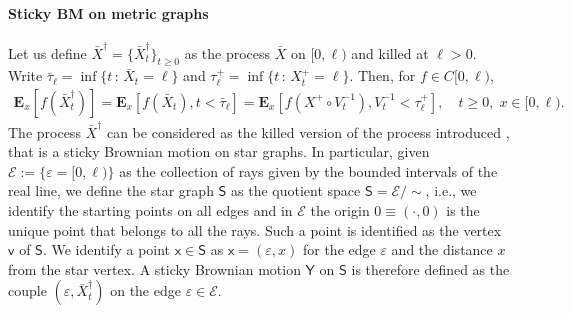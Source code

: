 \documentclass[[11pt,a4paper,reqno]{article}
\numberwithin{equation}{section}
\begin{document}
\paragraph{Sticky BM on metric graphs}
Let us define $\bar{X}^\dagger = \{\bar{X}^\dagger_t\}_{t\geq 0}$ as the process $\bar{X}$ on $[0, \ell)$ and killed at $\ell>0$. Write $\bar{\tau}_\ell = \inf\{t\,:\, \bar{X}_t=\ell\}$ and $\tau^+_\ell = \inf\{t\,:\, X^+_t=\ell\}$. Then, for $f \in C[0,\ell)$,
\begin{align*}
\mathbf{E}_x[f(\bar{X}^\dagger_t)] = \mathbf{E}_x[f(\bar{X}_t), t < \bar{\tau}_\ell] = \mathbf{E}_x[f(X^+ \circ V^{-1}_t), V^{-1}_t < \tau^+_\ell], \quad t\geq 0,\; x \in [0, \ell).
\end{align*}    
The process $\bar{X}^\dagger$ can be considered as the killed version of the process introduced \cite{BonDovStar}, that is a sticky Brownian motion on star graphs. In particular, given $\mathcal{E} := \{ \varepsilon=[0,\ell)  \}$ as the collection of rays given by the bounded intervals of the real line, we define the star graph $\mathsf{S}$ as the quotient space $\mathsf{S} = \mathcal{E}/\sim$, i.e., we identify the starting points on all edges and in $\mathcal{E}$ the origin $0 \equiv (\cdot, 0)$ is the unique point that belongs to all the rays. Such a point is identified as the vertex $\mathsf{v}$ of $\mathsf{S}$. We identify a point $\mathsf{x} \in \mathsf{S}$ as $\mathsf{x}=(\varepsilon, x)$ for the edge $\varepsilon$ and the distance $x$ from the star vertex. A sticky Brownian motion $\mathsf{Y}$ on $\mathsf{S}$ is therefore defined as the couple $(\varepsilon, \bar{X}^\dagger_t)$ on the edge $\varepsilon \in \mathcal{E}$.
\end{document}
